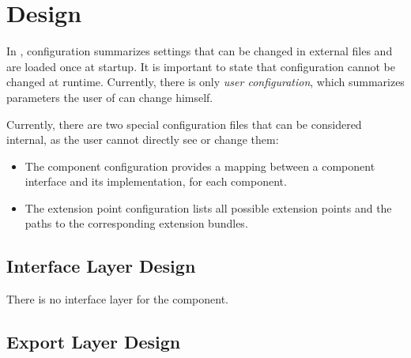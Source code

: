 
\section{\COMPconfiguration{} Design}
\label{sec:COMPconfigurationDesign}

In \LibName{}, configuration summarizes settings that can be changed in external files and are loaded once at \LibName{} startup. It is important to state that configuration cannot be changed at \LibName{} runtime. Currently, there is only \emph{user configuration}, which summarizes parameters the user of \LibName{} can change himself.

Currently, there are two special configuration files that can be considered internal, as the user cannot directly see or change them:
\begin{itemize}
	\item The component configuration provides a mapping between a component interface and its implementation, for each \LibName{} component.
	\item The extension point configuration lists all possible \LibName{} extension points and the paths to the corresponding extension bundles.
\end{itemize}


\subsection{Interface Layer Design}
\label{sec:InterfaceDesignCOMPconfiguration}

There is no interface layer for the \COMPconfiguration component.


\subsection{Export Layer Design}
\label{sec:ExportDesignCOMPconfiguration}

